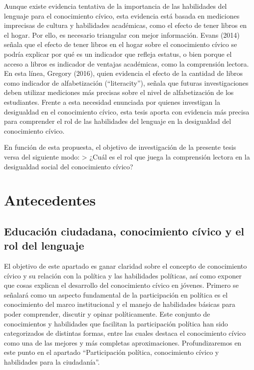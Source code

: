 \documentclass[12pt,twoside]{templates/facsothesis}
\begin{document}
Aunque existe evidencia tentativa de la importancia de las habilidades del lenguaje para el conocimiento cívico, esta evidencia está basada en mediciones imprecisas de cultura y habilidades académicas, como el efecto de tener libros en el hogar. Por ello, es necesario triangular con mejor información. Evans (2014) señala que el efecto de tener libros en el hogar sobre el conocimiento cívico se podría explicar por qué es un indicador que refleja estatus, o bien porque el acceso a libros es indicador de ventajas académicas, como la comprensión lectora. En esta línea, Gregory (2016), quien evidencia el efecto de la cantidad de libros como indicador de alfabetización (``literacity''), señala que futuras investigaciones deben utilizar mediciones más precisas sobre el nivel de alfabetización de los estudiantes. Frente a esta necesidad enunciada por quienes investigan la desigualdad en el conocimiento cívico, esta tesis aporta con evidencia más precisa para comprender el rol de las habilidades del lenguaje en la desigualdad del conocimiento cívico.

En función de esta propuesta, el objetivo de investigación de la presente tesis versa del siguiente modo:
\textgreater{} ¿Cuál es el rol que juega la comprensión lectora en la desigualdad social del conocimiento cívico?

\hypertarget{antecedentes}{%
\chapter{Antecedentes}\label{antecedentes}}

\hypertarget{educaciuxf3n-ciudadana-conocimiento-cuxedvico-y-el-rol-del-lenguaje}{%
\section{Educación ciudadana, conocimiento cívico y el rol del lenguaje}\label{educaciuxf3n-ciudadana-conocimiento-cuxedvico-y-el-rol-del-lenguaje}}

El objetivo de este apartado es ganar claridad sobre el concepto de conocimiento cívico y su relación con la política y las habilidades políticas, así como exponer que cosas explican el desarrollo del conocimiento cívico en jóvenes.
Primero se señalará como un aspecto fundamental de la participación en política es el conocimiento del marco institucional y el manejo de habilidades básicas para poder comprender, discutir y opinar políticamente. Este conjunto de conocimientos y habilidades que facilitan la participación política han sido categorizados de distintas formas, entre las cuales destaca el conocimiento cívico como una de las mejores y más completas aproximaciones. Profundizaremos en este punto en el apartado ``Participación política, conocimiento cívico y habilidades para la ciudadanía''.
\end{document}
